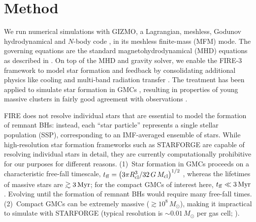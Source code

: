 \documentclass[twocolumn]{aastex631}
\begin{document}
\section{Method} \label{sec:method}

We run numerical simulations with {GIZMO}, a Lagrangian, meshless, Godunov hydrodynamical and $N$-body code \citep{Hopkins_2015MNRAS.450...53H}, in its meshless finite-mass (MFM) mode. The governing equations are the standard magnetohydrodynamical (MHD) equations as described in \citet{HopkinsRaives_2016MNRAS.455...51H}. On top of the MHD and gravity solver, we enable the FIRE-3 framework \citep{HopkinsKeresOnorbe_2014MNRAS.445..581H,HopkinsWetzelKeres_2018MNRAS.477.1578H,HopkinsWetzelKeres_2018MNRAS.480..800H,HopkinsWetzelWheeler_2023MNRAS.519.3154H} to model star formation and feedback by consolidating additional physics like cooling and multi-band radiation transfer \citep{HopkinsQuataertMurray_2012MNRAS.421.3488H,HopkinsWetzelKeres_2018MNRAS.480..800H,HopkinsGrudicWetzel_2020MNRAS.491.3702H}. The treatment has been applied to simulate star formation in GMCs \citep{GrudicHopkinsFaucher-Giguere_2018MNRAS.475.3511G}, resulting in properties of young massive clusters in fairly good agreement with observations \citep{GrudicGuszejnovHopkins_2018MNRAS.481..688G,GrudicHopkinsQuataert_2019MNRAS.483.5548G,GrudicHafenRodriguez_2023MNRAS.519.1366G}.

FIRE does not resolve individual stars that are essential to model the formation of remnant BHs: instead, each ``star particle'' represents a single stellar population (SSP), corresponding to an IMF-averaged ensemble of stars. While high-resolution star formation frameworks such as STARFORGE \citep{GrudicGuszejnovHopkins_2021MNRAS.506.2199G,GuszejnovGrudicHopkins_2021MNRAS.502.3646G} are capable of resolving individual stars in detail, they are currently computationally prohibitive for our purposes for different reasons. (1)~Star formation in GMCs proceeds on a characteristic free-fall timescale, $t_{\rm ff} = \left( 3\pi R_{\rm cl}^3 /32\,G\,M_{\rm cl} \right)^{1/2}$ \citep{ChevanceKrumholzMcLeod_2023ASPC..534....1C}, whereas the lifetimes of massive stars are $\gtrsim 3\,\rm Myr$; for the compact GMCs of interest here, $t_{\rm ff} \ll 3\,\rm Myr$. Evolving until the formation of remnant BHs would require many free-fall times. (2)~Compact GMCs can be extremely massive ($\gtrsim 10^{8}\,M_\odot$), making it impractical to simulate with STARFORGE (typical resolution is $\sim 0.01\,M_\odot$ per gas cell; \citealt{GrudicGuszejnovHopkins_2021MNRAS.506.2199G}).
\end{document}
